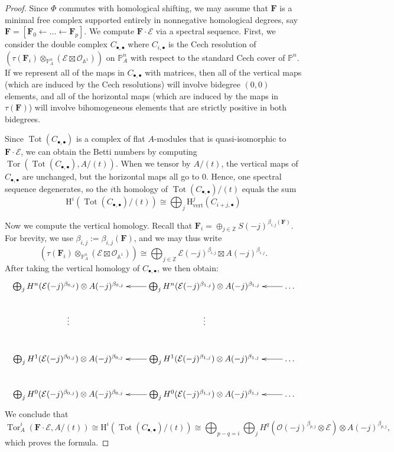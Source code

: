\documentclass[12pt]{amsart}
\theoremstyle{definition}
\theoremstyle{remark}
\newcommand{\Tor}{\operatorname{Tor}}
\newcommand{\Tot}{\operatorname{Tot}}
\newcommand{\PP}{\mathbb{P}}
\renewcommand{\AA}{\mathbb{A}}
\newcommand{\HH}{\mathrm{H}}
\newcommand{\ZZ}{\mathbb{Z}}
\newcommand{\cO}{\mathcal{O}}
\newcommand{\cE}{\mathcal{E}}
\newcommand{\FF}{\mathbf{F}}
\begin{document}
\begin{proof}
Since $\Phi$ commutes with homological shifting, we may assume that $\FF$ is a minimal free complex supported entirely in nonnegative homological degrees, say $\FF=[\FF_0\gets \dots \gets \FF_p]$.  
We  compute $\FF\cdot \cE$ via a  spectral sequence.  First, we consider the double complex $C_{\bullet, \bullet}$ where $C_{i,\bullet}$ is the Cech resolution of $\left( \tau(\FF_i)\otimes_{\PP^n_A} (\cE\boxtimes \cO_{\AA^1})\right)$ on $\PP^n_A$ with respect to the standard Cech cover of $\mathbb P^n$.  If we represent all of the maps in $C_{\bullet, \bullet}$ with matrices, then all of the vertical maps (which are induced by the Cech resolutions) will involve bidegree $(0,0)$ elements, and all of the horizontal maps (which are induced by the maps in $\tau(\FF)$) will involve bihomogeneous elements that are strictly positive in both bidegrees.

Since $\Tot(C_{\bullet, \bullet})$ is a complex of flat $A$-modules that is quasi-isomorphic to $\FF\cdot \cE$, we can obtain the Betti numbers by computing $\Tor(\Tot(C_{\bullet, \bullet}), A/(t))$.  When we tensor by $A/(t)$, the vertical maps of $C_{\bullet, \bullet}$ are unchanged, but the horizontal maps all go to $0$.  
Hence, one spectral sequence degenerates, so the $i$th homology of $\Tot(C_{\bullet,\bullet})/(t)$ equals the sum 
\[
\HH^i(\Tot(C_{\bullet,\bullet})/(t))\cong \bigoplus_{j} \HH^j_{\text{vert}}(C_{i+j,\bullet})
\]

Now we compute the vertical homology.  
Recall that $\FF_i=\oplus_{j\in \ZZ} S(-j)^{\beta_{i,j}(\FF)}$.  For brevity, we use $\beta_{i,j}:=\beta_{i,j}(\FF)$, and we may thus write 
\[
\left( \tau(\FF_i)\otimes_{\PP^n_A} (\cE\boxtimes \cO_{\AA^1})\right)\cong \bigoplus_{j\in \ZZ} \cE(-j)^{\beta_{i,j}}\boxtimes A(-j)^{\beta_{i,j}}.
\]
After taking the vertical homology of $C_{\bullet, \bullet}$, we then obtain:
\[
\xymatrix{
\bigoplus_{j} H^n(\cE(-j)^{\beta_{0,j}})\otimes A(-j)^{\beta_{0,j}}&\bigoplus_{j} H^n(\cE(-j)^{\beta_{1,j}})\otimes A(-j)^{\beta_{1,j}}\ar[l]&\dots\ar[l]\\
\vdots & \vdots&\\
\bigoplus_{j} H^1(\cE(-j)^{\beta_{0,j}})\otimes A(-j)^{\beta_{0,j}}&\bigoplus_{j} H^1(\cE(-j)^{\beta_{1,j}})\otimes A(-j)^{\beta_{1,j}}\ar[l]&\dots\ar[l]\\
\bigoplus_{j} H^0( \cE(-j)^{\beta_{0,j}})\otimes A(-j)^{\beta_{0,j}}&\bigoplus_{j} H^0(\cE(-j)^{\beta_{1,j}})\otimes A(-j)^{\beta_{1,j}}\ar[l]&\dots\ar[l]
}
\]
We conclude that
\[
\Tor^i_A(\FF\cdot \cE, A/(t))\cong \HH^i(\Tot(C_{\bullet,\bullet})/(t))\cong \bigoplus_{p-q=i} \bigoplus_{j} H^q(\cO(-j)^{\beta_{p,j}}\otimes \cE)\otimes A(-j)^{\beta_{p,j}},
\]
which proves the formula.
\end{proof}
\end{document}

